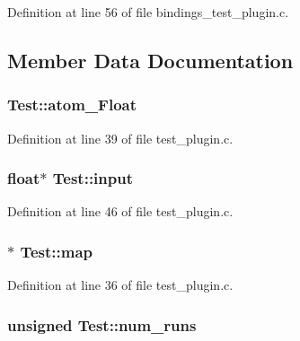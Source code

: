 Definition at line 56 of file bindings\+\_\+test\+\_\+plugin.\+c.



\subsection{Member Data Documentation}
\subsubsection[{\texorpdfstring{atom\+\_\+\+Float}{atom_Float}}]{ Test\+::atom\+\_\+\+Float}\hypertarget{struct_test_ac909fa1372a76c60714f9767172cd63e}{}\label{struct_test_ac909fa1372a76c60714f9767172cd63e}


Definition at line 39 of file test\+\_\+plugin.\+c.

\subsubsection[{\texorpdfstring{input}{input}}]{\setlength{\rightskip}{0pt plus 5cm}float$\ast$ Test\+::input}\hypertarget{struct_test_aca605d7ff8d02ca913510079bce17e5b}{}\label{struct_test_aca605d7ff8d02ca913510079bce17e5b}


Definition at line 46 of file test\+\_\+plugin.\+c.

\subsubsection[{\texorpdfstring{map}{map}}]{$\ast$ Test\+::map}\hypertarget{struct_test_ad05518bffce657f39ce4b74577ea0db5}{}\label{struct_test_ad05518bffce657f39ce4b74577ea0db5}


Definition at line 36 of file test\+\_\+plugin.\+c.

\subsubsection[{\texorpdfstring{num\+\_\+runs}{num_runs}}]{\setlength{\rightskip}{0pt plus 5cm}unsigned Test\+::num\+\_\+runs}\hypertarget{struct_test_aff8d3029e4300e68019b632bc3581d75}{}\label{struct_test_aff8d3029e4300e68019b632bc3581d75}


